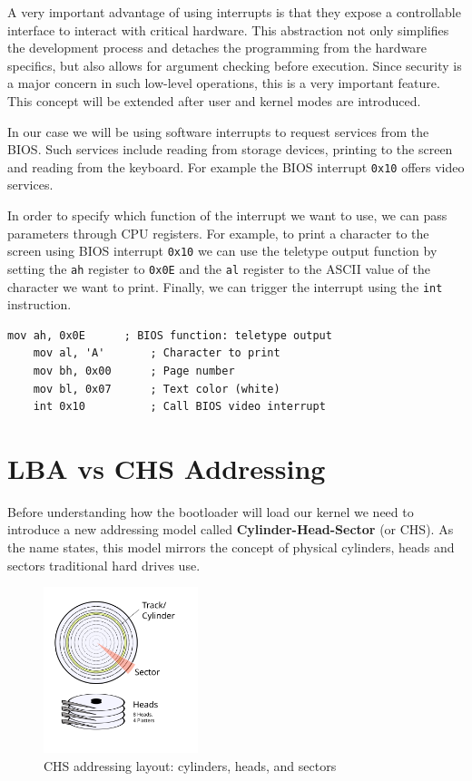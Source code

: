 A very important advantage of using interrupts is that they expose a controllable interface to interact with critical
hardware. This abstraction not only simplifies the development process and detaches the programming from the hardware
specifics, but also allows for argument checking before execution. Since security is a major concern in such low-level
operations, this is a very important feature. This concept will be extended after user and kernel modes are introduced.

In our case we will be using software interrupts to request services from the BIOS. Such services include reading from
storage devices, printing to the screen and reading from the keyboard. For example the BIOS interrupt \texttt{0x10}
offers video services.

In order to specify which function of the interrupt we want to use, we can pass parameters through CPU registers.
For example, to print a character to the screen using BIOS interrupt \texttt{0x10} we can use the teletype output function
by setting the \texttt{ah} register to \texttt{0x0E} and the \texttt{al} register to the ASCII value of the character we want
to print. Finally, we can trigger the interrupt using the \texttt{int} instruction.

\begin{lstlisting}[caption={Simple BIOS interrupt call in assembly}]
    mov ah, 0x0E      ; BIOS function: teletype output
    mov al, 'A'       ; Character to print
    mov bh, 0x00      ; Page number
    mov bl, 0x07      ; Text color (white)
    int 0x10          ; Call BIOS video interrupt
\end{lstlisting}


\section{LBA vs CHS Addressing}

Before understanding how the bootloader will load our kernel we need to introduce a new addressing
model called \textbf{Cylinder-Head-Sector} (or CHS). As the name states, this model mirrors the concept of physical 
cylinders, heads and sectors traditional hard drives use. 

\begin{figure}[H]
    \centering
    \includegraphics[width=0.4\textwidth]{images/chs_diagram.png}
    \caption{CHS addressing layout: cylinders, heads, and sectors}
    \label{fig:chs}
\end{figure}

